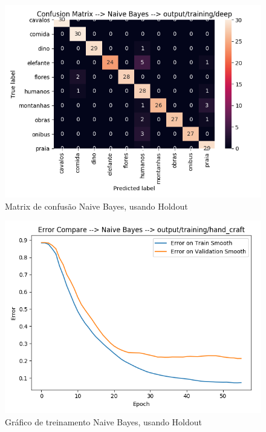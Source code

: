 \documentclass[
article,			%
11pt,				%
oneside,			%
a4paper,			%
english,			%
brazil,				%
sumario=tradicional,
]{abntex2}
\begin{document}
\begin{anexosenv}
	
		\begin{figure}[htb]
			\caption{\label{confusion-matrix-naive-holdout-deep}Matrix de confusão Naive Bayes, usando Holdout}
			\begin{center}
				\includegraphics[scale=0.5]{confusion-matrix-naive-holdout-deep.png}
			\end{center}
		\end{figure}
	
		\begin{figure}[htb]
			\caption{\label{error-naive-bayes-hand-craft-holdout}Gráfico de treinamento Naive Bayes, usando Holdout}
			\begin{center}
				\includegraphics[scale=0.5]{error-naive-bayes-hand-craft-holdout.png}
			\end{center}
		\end{figure}
	

\end{anexosenv}
\end{document}
